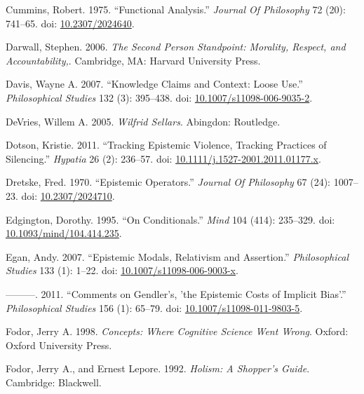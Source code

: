 \documentclass[
  10pt,
  letterpaper,
  DIV=11,
  numbers=noendperiod,
  twoside]{scrartcl}
\newlength{\cslhangindent}
\newenvironment{CSLReferences}[2] %
 {\begin{list}{}{%
  \setlength{\itemindent}{0pt}
  \setlength{\leftmargin}{0pt}
  \setlength{\parsep}{0pt}
  \ifodd #1
   \setlength{\leftmargin}{\cslhangindent}
   \setlength{\itemindent}{-1\cslhangindent}
  \fi
  \setlength{\itemsep}{#2\baselineskip}}}
 {\end{list}}
\begin{document}
\begin{CSLReferences}{1}{0}
Cummins, Robert. 1975. {``Functional Analysis.''} \emph{Journal Of
Philosophy} 72 (20): 741--65. doi:
\href{https://doi.org/10.2307/2024640}{10.2307/2024640}.

Darwall, Stephen. 2006. \emph{The Second Person Standpoint: Morality,
Respect, and Accountability,}. Cambridge, MA: Harvard University Press.

Davis, Wayne A. 2007. {``Knowledge Claims and Context: Loose Use.''}
\emph{Philosophical Studies} 132 (3): 395--438. doi:
\href{https://doi.org/10.1007/s11098-006-9035-2}{10.1007/s11098-006-9035-2}.

DeVries, Willem A. 2005. \emph{Wilfrid Sellars}. Abingdon: Routledge.

Dotson, Kristie. 2011. {``Tracking Epistemic Violence, Tracking
Practices of Silencing.''} \emph{Hypatia} 26 (2): 236--57. doi:
\href{https://doi.org/10.1111/j.1527-2001.2011.01177.x}{10.1111/j.1527-2001.2011.01177.x}.

Dretske, Fred. 1970. {``Epistemic Operators.''} \emph{Journal Of
Philosophy} 67 (24): 1007--23. doi:
\href{https://doi.org/10.2307/2024710}{10.2307/2024710}.

Edgington, Dorothy. 1995. {``On Conditionals.''} \emph{Mind} 104 (414):
235--329. doi:
\href{https://doi.org/10.1093/mind/104.414.235}{10.1093/mind/104.414.235}.

Egan, Andy. 2007. {``Epistemic Modals, Relativism and Assertion.''}
\emph{Philosophical Studies} 133 (1): 1--22. doi:
\href{https://doi.org/10.1007/s11098-006-9003-x}{10.1007/s11098-006-9003-x}.

---------. 2011. {``Comments on Gendler's, 'the Epistemic Costs of
Implicit Bias'.''} \emph{Philosophical Studies} 156 (1): 65--79. doi:
\href{https://doi.org/10.1007/s11098-011-9803-5}{10.1007/s11098-011-9803-5}.

Fodor, Jerry A. 1998. \emph{Concepts: Where Cognitive Science Went
Wrong}. Oxford: Oxford University Press.

Fodor, Jerry A., and Ernest Lepore. 1992. \emph{Holism: A Shopper's
Guide}. Cambridge: Blackwell.


\end{CSLReferences}
\end{document}
